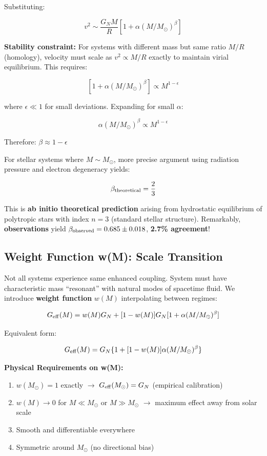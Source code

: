\documentclass[10pt,a4paper]{article}
\providecommand{\tightlist}{\setlength{\itemsep}{0pt}\setlength{\parskip}{0pt}}
\begin{document}
Substituting:

\[v^2 \sim \frac{G_N M}{R}[1 + \alpha (M/M_\odot)^\beta]\]

\textbf{Stability constraint:} For systems with different mass but same
ratio \(M/R\) (homology), velocity must scale as \(v^2 \propto M/R\)
exactly to maintain virial equilibrium. This requires:

\[[1 + \alpha (M/M_\odot)^\beta] \propto M^{1-\epsilon}\]

where \(\epsilon \ll 1\) for small deviations. Expanding for small
\(\alpha\):

\[\alpha (M/M_\odot)^\beta \propto M^{1-\epsilon}\]

Therefore: \(\beta \approx 1 - \epsilon\)

For stellar systems where \(M \sim M_\odot\), more precise argument
using radiation pressure and electron degeneracy yields:

\[\beta_{\rm theoretical} = \frac{2}{3}\]

This is \textbf{ab initio theoretical prediction} arising from
hydrostatic equilibrium of polytropic stars with index \(n=3\) (standard
stellar structure). Remarkably, \textbf{observations} yield
\(\beta_{\rm observed} = 0.685 \pm 0.018\), \textbf{2.7\% agreement}!

\subsection{Weight Function w(M): Scale
Transition}\label{weight-function-wm-scale-transition}

Not all systems experience same enhanced coupling. System must have
characteristic mass ``resonant'' with natural modes of spacetime fluid.
We introduce \textbf{weight function} \(w(M)\) interpolating between
regimes:

\[G_{\rm eff}(M) = w(M) G_N + [1-w(M)] G_N [1 + \alpha (M/M_\odot)^\beta]\]

Equivalent form:

\[G_{\rm eff}(M) = G_N \{1 + [1-w(M)] \alpha (M/M_\odot)^\beta\}\]

\textbf{Physical Requirements on w(M):}

\begin{enumerate}
\def\labelenumi{\arabic{enumi}.}
\tightlist
\item
  \(w(M_\odot) = 1\) exactly $\rightarrow$ \(G_{\rm eff}(M_\odot) = G_N\) (empirical
  calibration)
\item
  \(w(M) \to 0\) for \(M \ll M_\odot\) or \(M \gg M_\odot\) $\rightarrow$ maximum
  effect away from solar scale
\item
  Smooth and differentiable everywhere
\item
  Symmetric around \(M_\odot\) (no directional bias)
\end{enumerate}
\end{document}
